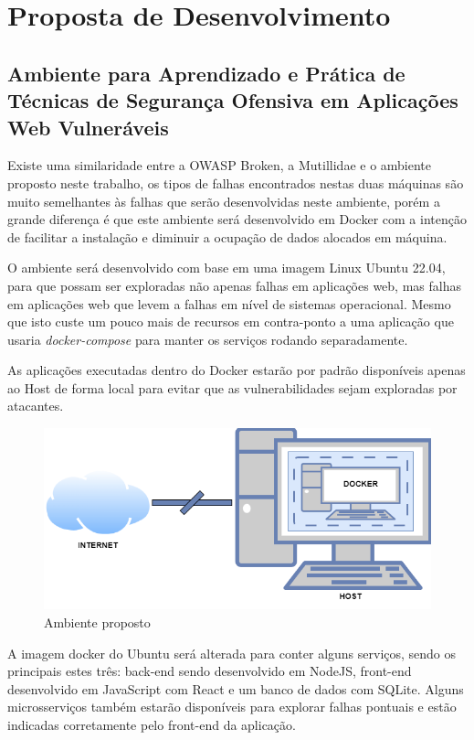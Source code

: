\chapter{Proposta de Desenvolvimento}

\section{Ambiente para Aprendizado e Prática de Técnicas de Segurança
Ofensiva em Aplicações Web Vulneráveis}

Existe uma similaridade entre a OWASP Broken, a Mutillidae e o ambiente proposto neste trabalho, os tipos de falhas encontrados nestas duas máquinas são muito semelhantes às falhas que serão desenvolvidas neste ambiente, porém a grande diferença é que este ambiente será desenvolvido em Docker com a intenção de facilitar a instalação e diminuir a ocupação de dados alocados em máquina.

O ambiente será desenvolvido com base em uma imagem Linux Ubuntu 22.04, para que possam ser exploradas não apenas falhas em aplicações web, mas falhas em aplicações web que levem a falhas em nível de sistemas operacional. Mesmo que isto custe um pouco mais de recursos em contra-ponto a uma aplicação que usaria \textit{docker-compose} para manter os serviços rodando separadamente.

As aplicações executadas dentro do Docker estarão por padrão disponíveis apenas ao Host de forma local para evitar que as vulnerabilidades sejam exploradas por atacantes.

\begin{figure}[!htb]
     \centering
     \includegraphics[width=15cm]{proposal.png}
     \caption{Ambiente proposto}
     \label{Label de referência para a imagem}
\end{figure}

A imagem docker do Ubuntu será alterada para conter alguns serviços, sendo os principais estes três: back-end sendo desenvolvido em NodeJS, front-end desenvolvido em JavaScript com React e um banco de dados com SQLite.
Alguns microsserviços também estarão disponíveis para explorar falhas pontuais e estão indicadas corretamente pelo front-end da aplicação.


